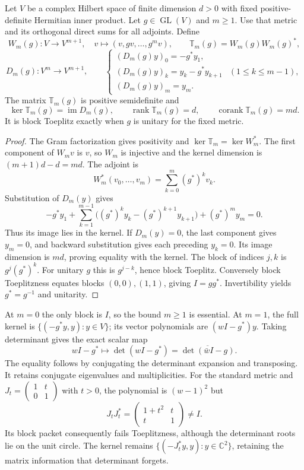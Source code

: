\begin{theorem}
\label{thm:sz-block-packet}
Let $V$ be a complex Hilbert space of finite dimension $d>0$ with fixed positive-definite Hermitian inner product. Let $g\in\operatorname{GL}(V)$ and $m\ge1$. Use that metric and its orthogonal direct sums for all adjoints. Define
\[
W_m(g):V\to V^{m+1},\quad v\mapsto(v,gv,\ldots,g^mv),\qquad
\mathbb T_m(g)=W_m(g)W_m(g)^*,
\]
\[
D_m(g):V^m\to V^{m+1},\qquad
\begin{cases}
(D_m(g)y)_0=-g^*y_1,\\
(D_m(g)y)_k=y_k-g^*y_{k+1}&(1\le k\le m-1),\\
(D_m(g)y)_m=y_m .
\end{cases}
\]
The matrix $\mathbb T_m(g)$ is positive semidefinite and
\[
\ker\mathbb T_m(g)=\operatorname{im}D_m(g),\qquad
\operatorname{rank}\mathbb T_m(g)=d,\qquad
\operatorname{corank}\mathbb T_m(g)=md .
\]
It is block Toeplitz exactly when $g$ is unitary for the fixed metric.
\end{theorem}
\begin{proof}
The Gram factorization gives positivity and $\ker\mathbb T_m=\ker W_m^*$. The first component of $W_mv$ is $v$, so $W_m$ is injective and the kernel dimension is $(m+1)d-d=md$. The adjoint is
\[
W_m^*(v_0,\ldots,v_m)=\sum_{k=0}^m(g^*)^k v_k.
\]
Substitution of $D_m(y)$ gives
\[
-g^*y_1+\sum_{k=1}^{m-1}
\big((g^*)^ky_k-(g^*)^{k+1}y_{k+1}\big)+(g^*)^my_m=0.
\]
Thus its image lies in the kernel. If $D_m(y)=0$, the last component gives $y_m=0$, and backward substitution gives each preceding $y_k=0$. Its image dimension is $md$, proving equality with the kernel. The block of indices $j,k$ is $g^j(g^*)^k$. For unitary $g$ this is $g^{j-k}$, hence block Toeplitz. Conversely block Toeplitzness equates blocks $(0,0),(1,1)$, giving $I=gg^*$. Invertibility yields $g^*=g^{-1}$ and unitarity.
\end{proof}

At $m=0$ the only block is $I$, so the bound $m\ge1$ is essential. At $m=1$, the full kernel is $\{(-g^*y,y):y\in V\}$; its vector polynomials are $(wI-g^*)y$. Taking determinant gives the exact scalar map
\[
wI-g^*\longmapsto\det(wI-g^*)=\overline{\det(\bar wI-g)}.
\]
The equality follows by conjugating the determinant expansion and transposing. It retains conjugate eigenvalues and multiplicities. For the standard metric and $J_t=\left(\begin{smallmatrix}1&t\\0&1\end{smallmatrix}\right)$ with $t>0$, the polynomial is $(w-1)^2$ but
\[
J_tJ_t^*=\begin{pmatrix}1+t^2&t\\t&1\end{pmatrix}\ne I.
\]
Its block packet consequently fails Toeplitzness, although the determinant roots lie on the unit circle. The kernel remains $\{(-J_t^*y,y):y\in\mathbb C^2\}$, retaining the matrix information that determinant forgets.
